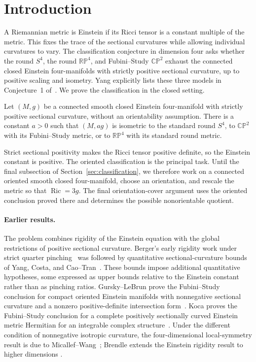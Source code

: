 \section{Introduction}\label{sec:introduction}

A Riemannian metric is Einstein if its Ricci tensor is a constant
multiple of the metric. This fixes the trace of the sectional curvatures
while allowing individual curvatures to vary. The classification
conjecture in dimension four asks whether the round $S^4$, the round
$\mathbb{RP}^4$, and Fubini--Study $\mathbb{CP}^2$ exhaust the connected
closed Einstein four-manifolds with strictly positive sectional curvature,
up to positive scaling and isometry. Yang explicitly lists these three
models in Conjecture~1 of~\cite{Yang2000}. We prove the classification
in the closed setting.

\begin{theorem}\label{thm:classification}
Let $(M,g)$ be a connected smooth closed Einstein four-manifold with
strictly positive sectional curvature, without an orientability
assumption. There is a constant $a>0$ such that $(M,ag)$ is isometric to
the standard round $S^4$, to $\mathbb{CP}^2$ with its Fubini--Study
metric, or to $\mathbb{RP}^4$ with its standard round metric.
\end{theorem}

Strict sectional positivity makes the Ricci tensor positive definite,
so the Einstein constant is positive. The oriented classification is the
principal task. Until the final subsection of
Section~\ref{sec:classification}, we therefore work on a connected
oriented smooth closed four-manifold, choose an orientation, and rescale
the metric so that $\operatorname{Ric}=3g$. The final orientation-cover
argument uses the oriented conclusion proved there and determines the
possible nonorientable quotient.

\paragraph{Earlier results.}
The problem combines rigidity of the Einstein equation with the global
restrictions of positive sectional curvature. Berger's early rigidity
work under strict quarter pinching~\cite{Berger1961} was followed by
quantitative sectional-curvature bounds of Yang, Costa, and
Cao--Tran~\cite{Yang2000,Costa2004,CaoTran2018}. These bounds impose
additional quantitative hypotheses, some expressed as upper bounds
relative to the Einstein constant rather than as pinching ratios.
Gursky--LeBrun prove the Fubini--Study conclusion for compact oriented
Einstein manifolds with nonnegative sectional curvature and a nonzero
positive-definite intersection form~\cite[Theorem~A]{GurskyLeBrun1999}.
Koca proves the Fubini--Study conclusion for a complete positively sectionally
curved Einstein metric Hermitian for an integrable complex
structure~\cite[Theorem~2]{Koca2014}. Under the different condition of
nonnegative isotropic curvature, the four-dimensional local-symmetry
result is due to Micallef--Wang~\cite[Theorem~4.4]{MicallefWang1993};
Brendle extends the Einstein rigidity result to higher dimensions
\cite[Theorem~1]{Brendle2010}.

